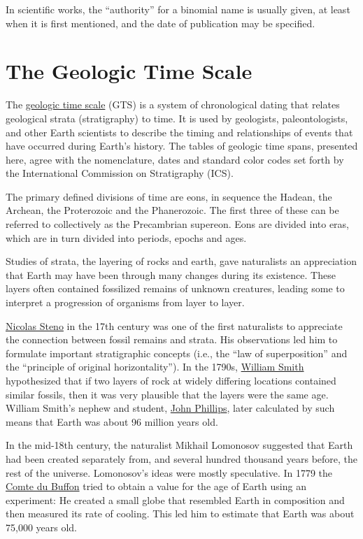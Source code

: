 In scientific works, the ``authority'' for a binomial name is usually
given, at least when it is first mentioned, and the date of publication
may be specified.

\section{The Geologic Time Scale}\label{the-geologic-time-scale}

The \href{https://en.wikipedia.org/wiki/Geologic_time_scale}{geologic
time scale} (GTS) is a system of chronological dating that relates
geological strata (stratigraphy) to time. It is used by geologists,
paleontologists, and other Earth scientists to describe the timing and
relationships of events that have occurred during Earth's history. The
tables of geologic time spans, presented here, agree with the
nomenclature, dates and standard color codes set forth by the
International Commission on Stratigraphy (ICS).

The primary defined divisions of time are eons, in sequence the Hadean,
the Archean, the Proterozoic and the Phanerozoic. The first three of
these can be referred to collectively as the Precambrian supereon. Eons
are divided into eras, which are in turn divided into periods, epochs
and ages.

Studies of strata, the layering of rocks and earth, gave naturalists an
appreciation that Earth may have been through many changes during its
existence. These layers often contained fossilized remains of unknown
creatures, leading some to interpret a progression of organisms from
layer to layer.

\href{https://en.wikipedia.org/wiki/Nicolas_Steno}{Nicolas Steno} in the 17th century was one of the first naturalists to
appreciate the connection between fossil remains and strata. His
observations led him to formulate important stratigraphic concepts
(i.e., the ``law of superposition'' and the ``principle of original
horizontality''). In the 1790s, \href{https://en.wikipedia.org/wiki/William_Smith_(geologist)}{William Smith} hypothesized that if two
layers of rock at widely differing locations contained similar fossils,
then it was very plausible that the layers were the same age. William
Smith's nephew and student, \href{https://en.wikipedia.org/wiki/John_Phillips_(geologist)}{John Phillips}, later calculated by such
means that Earth was about 96 million years old.

In the mid-18th century, the naturalist Mikhail Lomonosov suggested that
Earth had been created separately from, and several hundred thousand
years before, the rest of the universe. Lomonosov's ideas were mostly
speculative. In 1779 the \href{https://en.wikipedia.org/wiki/Georges-Louis_Leclerc,_Comte_de_Buffon}{Comte du Buffon} tried to obtain a value for the
age of Earth using an experiment: He created a small globe that
resembled Earth in composition and then measured its rate of cooling.
This led him to estimate that Earth was about 75,000 years old.

